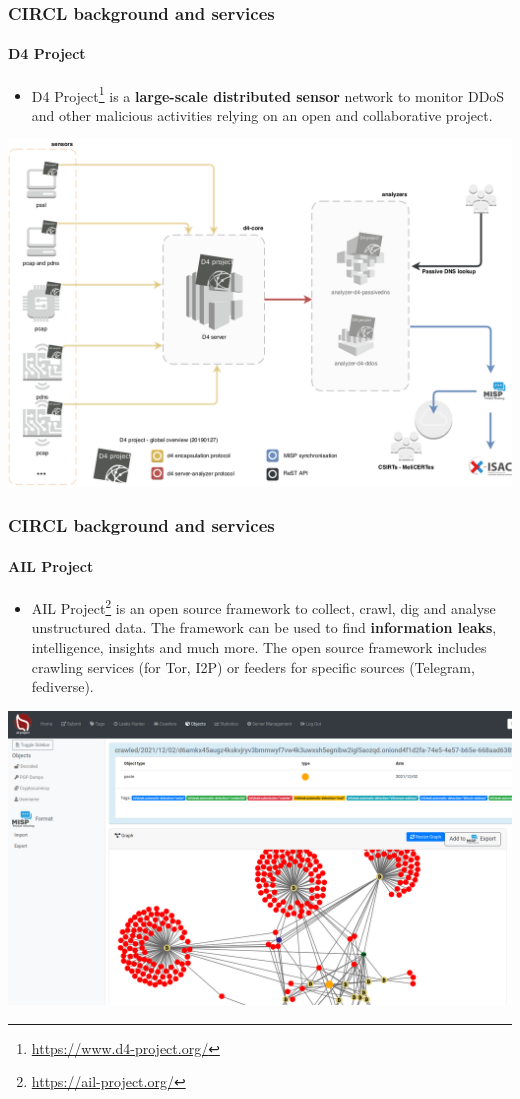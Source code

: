 \begin{frame}
    \frametitle{CIRCL background and services}
    \framesubtitle{D4 Project}
    \begin{itemize}
        \item D4 Project\footnote{\url{https://www.d4-project.org/}} is a {\bf large-scale distributed sensor} network to monitor DDoS and other malicious activities relying on an open and collaborative project.
    \end{itemize}
    \begin{center}
    \includegraphics[scale=0.20]{d4-overview.png}
    \end{center}
\end{frame}

\begin{frame}
    \frametitle{CIRCL background and services}
    \framesubtitle{AIL Project}
    \begin{itemize}
        \item AIL Project\footnote{\url{https://ail-project.org/}} is an open source framework to collect, crawl, dig and analyse unstructured data. The framework can be used to find {\bf information leaks}, intelligence, insights and much more. The open source framework includes crawling services (for Tor, I2P) or feeders for specific sources (Telegram, fediverse). 
    \end{itemize}
    \begin{center}
    \includegraphics[scale=0.15]{ail-new.png}
    \end{center}
\end{frame}

